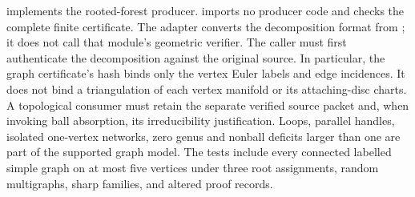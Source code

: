  implements the rooted-forest producer.
 imports no producer code and checks
the complete finite certificate.  The adapter
 converts the decomposition format from
; it does not call that module's geometric
verifier.  The caller must first authenticate the decomposition against
the original source.  In particular, the graph certificate's hash binds
only the vertex Euler labels and edge incidences.  It does not bind a
triangulation of each vertex manifold or its attaching-disc charts.
A topological consumer must retain the separate verified source packet
and, when invoking ball absorption, its irreducibility justification.
Loops, parallel handles, isolated one-vertex networks, zero genus and
nonball deficits larger than one are part of the supported graph model.
The tests include every connected labelled simple graph on at most five
vertices under three root assignments, random multigraphs, sharp families,
and altered proof records.
